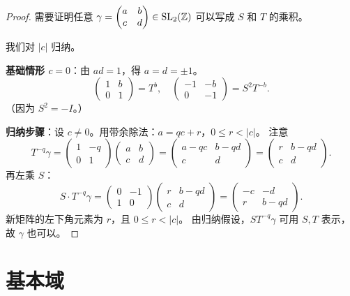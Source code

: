 \begin{proof}
需要证明任意 $\gamma = \begin{pmatrix} a & b \\ c & d \end{pmatrix} \in \mathrm{SL}_2(\mathbb{Z})$
可以写成 $S$ 和 $T$ 的乘积。

我们对 $|c|$ 归纳。

\textbf{基础情形 $c = 0$}：由 $ad = 1$，得 $a = d = \pm 1$。
\[
  \begin{pmatrix} 1 & b \\ 0 & 1 \end{pmatrix} = T^b, \quad
  \begin{pmatrix} -1 & -b \\ 0 & -1 \end{pmatrix} = S^2 T^{-b}.
\]
（因为 $S^2 = -I$。）

\textbf{归纳步骤}：设 $c \neq 0$。用带余除法：$a = qc + r$，$0 \leq r < |c|$。
注意
\[
  T^{-q} \gamma
  = \begin{pmatrix} 1 & -q \\ 0 & 1 \end{pmatrix}
    \begin{pmatrix} a & b \\ c & d \end{pmatrix}
  = \begin{pmatrix} a - qc & b - qd \\ c & d \end{pmatrix}
  = \begin{pmatrix} r & b-qd \\ c & d \end{pmatrix}.
\]
再左乘 $S$：
\[
  S \cdot T^{-q} \gamma
  = \begin{pmatrix} 0 & -1 \\ 1 & 0 \end{pmatrix}
    \begin{pmatrix} r & b-qd \\ c & d \end{pmatrix}
  = \begin{pmatrix} -c & -d \\ r & b-qd \end{pmatrix}.
\]
新矩阵的左下角元素为 $r$，且 $0 \leq r < |c|$。
由归纳假设，$ST^{-q}\gamma$ 可用 $S, T$ 表示，故 $\gamma$ 也可以。
\end{proof}


\section{基本域}
\label{sec:fundamental-domain}

